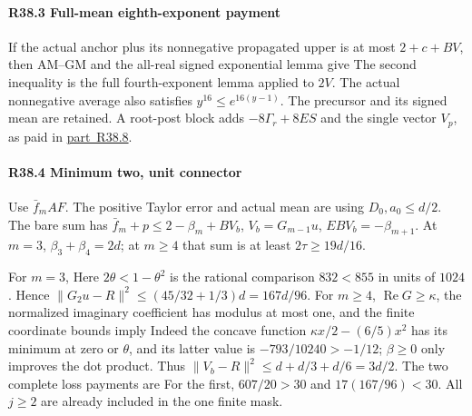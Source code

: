 \paragraph{R38.3 Full-mean eighth-exponent payment}

If the actual anchor plus its nonnegative propagated upper is at most \(2+c+BV\), then AM--GM and the all-real signed exponential lemma give
The second inequality is the full fourth-exponent lemma applied to \(2V\). The actual nonnegative average also satisfies \(y^{16}\le e^{16(y-1)}\). The precursor and its signed mean are retained. A root-post block adds \(-8\Gamma_r+8ES\) and the single vector \(V_p\), as paid in \mbox{\hyperref[part:R38.8]{part R38.8}}.

\paragraph{R38.4 Minimum two, unit connector}

Use \(\bar f_mAF\). The positive Taylor error and actual mean are
using \(D_0,\allowbreak a_0\le d/2\). The bare sum has \(\bar f_m+p\le2-\beta_m+BV_b\), \(V_b=G_{m-1}u\), \(EBV_b=-\beta_{m+1}\). At \(m=3\), \(\beta_3+\beta_4=2d\); at \(m\ge4\) that sum is at least \(2\tau\ge19d/16\).

For \(m=3\),
Here \(2\theta<1-\theta^2\) is the rational comparison \(832<855\) in units of \(1024\). Hence \(\|G_2u-R\|^2\le(45/32+1/3)d=167d/96\). For \(m\ge4\), \(\operatorname{Re}G\ge\kappa\), the normalized imaginary coefficient has modulus at most one, and the finite coordinate bounds imply
Indeed the concave function \(\kappa x/2-(6/5)x^2\) has its minimum at zero or \(\theta\), and its latter value is \(-793/10240>-1/12\); \(\beta\ge0\) only improves the dot product. Thus \(\|V_b-R\|^2\le d+d/3+d/6=3d/2\). The two complete loss payments are
For the first, \(607/20>30\) and \(17(167/96)<30\). All \(j\ge2\) are already included in the one finite mask.

